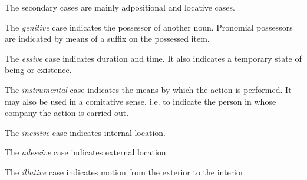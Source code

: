 \documentclass[grammar]{subfiles}
\begin{document}
  The secondary cases are mainly adpositional and locative cases.

  \label{nm_genitive_case}

  The \emph{genitive} case indicates the possessor of another noun.  Pronomial
  possessors are indicated by means of a suffix on the possessed item.

  \label{nm_essive_case}

  The \emph{essive} case indicates duration and time.  It also indicates a
  temporary state of being or existence.

  \label{nm_instrumental_case}

  The \emph{instrumental} case indicates the means by which the action is
  performed.  It may also be used in a comitative sense, i.e. to indicate the
  person in whose company the action is carried out.

  \label{nm_inessive_case}

  The \emph{inessive} case indicates internal location. 

  \label{nm_adessive_case}

  The \emph{adessive} case indicates external location.

  \label{nm_illative_case}

  The \emph{illative} case indicates motion from the exterior to the interior.

  \label{nm_allative_case}
\end{document}
